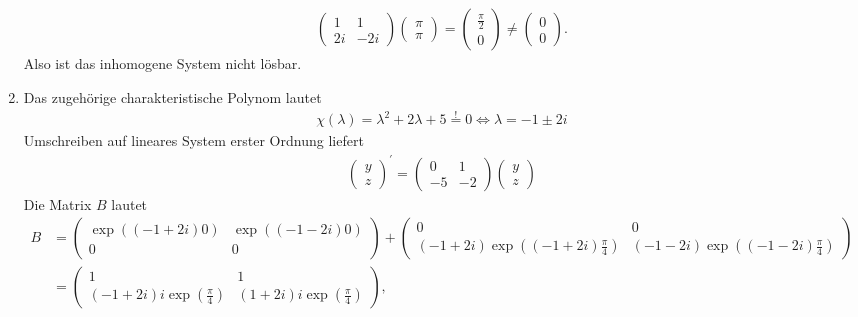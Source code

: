 \begin{solution}
\begin{enumerate}[label = \textbf{\alph*)}]
\begin{align*}
\begin{pmatrix}
      1 & 1 \\ 2i & -2i
    \end{pmatrix}
    \begin{pmatrix}
      \pi \\
      \pi
    \end{pmatrix}
    = \begin{pmatrix}
      \frac{\pi}{2} \\ 0
    \end{pmatrix}
    \neq \begin{pmatrix}
      0 \\ 0
    \end{pmatrix}.
  \end{align*}
  Also ist das inhomogene System nicht lösbar.
  \item Das zugehörige charakteristische Polynom lautet
  \begin{align*}
    \chi(\lambda) = \lambda^2 + 2\lambda + 5 \stackrel{!}{=} 0
    \iff \lambda = -1 \pm 2i
  \end{align*}
  Umschreiben auf lineares System erster Ordnung liefert
  \begin{align*}
    \begin{pmatrix}
      y \\ z
    \end{pmatrix}^{\prime}
    = \begin{pmatrix}
      0 & 1 \\
      -5 & -2
    \end{pmatrix}
    \begin{pmatrix}
      y \\ z
    \end{pmatrix}
  \end{align*}
  Die Matrix $B$ lautet
  \begin{align*}
    B &= \begin{pmatrix}
      \exp((-1 + 2i)0) & \exp((-1 - 2i)0) \\ 0 & 0
    \end{pmatrix}
    +
    \begin{pmatrix}
       0 & 0\\ (-1 + 2i)\exp((-1 + 2i)\frac{\pi}{4}) & (-1 -2i)\exp((-1 - 2i)\frac{\pi}{4})
    \end{pmatrix} \\
    &= \begin{pmatrix}
      1 & 1\\
      (-1 + 2i)i\exp(\frac{\pi}{4}) & (1 + 2i)i\exp(\frac{\pi}{4})
    \end{pmatrix},

\end{align*}
\end{enumerate}
\end{solution}
